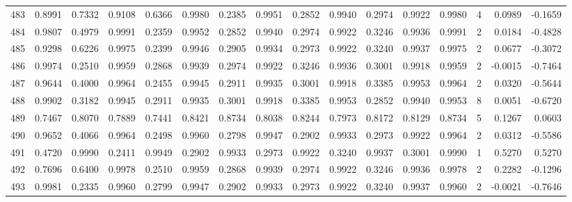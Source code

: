 \begin{tabular}{lrrrrrrrrrrrrrrr}
483 &      0.8991 &  0.7332 &  0.9108 &  0.6366 &  0.9980 &  0.2385 &  0.9951 &  0.2852 &  0.9940 &  0.2974 &   0.9922 &     0.9980 &      4 &                    0.0989 &                    -0.1659 \\
484 &      0.9807 &  0.4979 &  0.9991 &  0.2359 &  0.9952 &  0.2852 &  0.9940 &  0.2974 &  0.9922 &  0.3246 &   0.9936 &     0.9991 &      2 &                    0.0184 &                    -0.4828 \\
485 &      0.9298 &  0.6226 &  0.9975 &  0.2399 &  0.9946 &  0.2905 &  0.9934 &  0.2973 &  0.9922 &  0.3240 &   0.9937 &     0.9975 &      2 &                    0.0677 &                    -0.3072 \\
486 &      0.9974 &  0.2510 &  0.9959 &  0.2868 &  0.9939 &  0.2974 &  0.9922 &  0.3246 &  0.9936 &  0.3001 &   0.9918 &     0.9959 &      2 &                   -0.0015 &                    -0.7464 \\
487 &      0.9644 &  0.4000 &  0.9964 &  0.2455 &  0.9945 &  0.2911 &  0.9935 &  0.3001 &  0.9918 &  0.3385 &   0.9953 &     0.9964 &      2 &                    0.0320 &                    -0.5644 \\
488 &      0.9902 &  0.3182 &  0.9945 &  0.2911 &  0.9935 &  0.3001 &  0.9918 &  0.3385 &  0.9953 &  0.2852 &   0.9940 &     0.9953 &      8 &                    0.0051 &                    -0.6720 \\
489 &      0.7467 &  0.8070 &  0.7889 &  0.7441 &  0.8421 &  0.8734 &  0.8038 &  0.8244 &  0.7973 &  0.8172 &   0.8129 &     0.8734 &      5 &                    0.1267 &                     0.0603 \\
490 &      0.9652 &  0.4066 &  0.9964 &  0.2498 &  0.9960 &  0.2798 &  0.9947 &  0.2902 &  0.9933 &  0.2973 &   0.9922 &     0.9964 &      2 &                    0.0312 &                    -0.5586 \\
491 &      0.4720 &  0.9990 &  0.2411 &  0.9949 &  0.2902 &  0.9933 &  0.2973 &  0.9922 &  0.3240 &  0.9937 &   0.3001 &     0.9990 &      1 &                    0.5270 &                     0.5270 \\
492 &      0.7696 &  0.6400 &  0.9978 &  0.2510 &  0.9959 &  0.2868 &  0.9939 &  0.2974 &  0.9922 &  0.3246 &   0.9936 &     0.9978 &      2 &                    0.2282 &                    -0.1296 \\
493 &      0.9981 &  0.2335 &  0.9960 &  0.2799 &  0.9947 &  0.2902 &  0.9933 &  0.2973 &  0.9922 &  0.3240 &   0.9937 &     0.9960 &      2 &                   -0.0021 &                    -0.7646 \\

\end{tabular}
